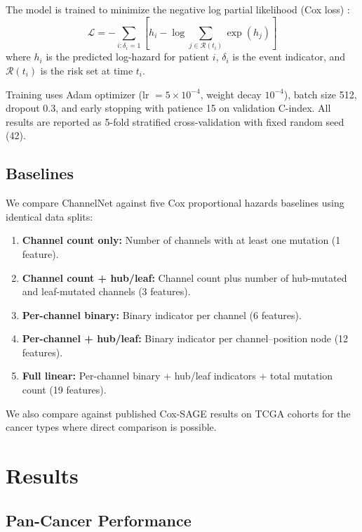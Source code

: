 \documentclass[11pt]{article}
\begin{document}
The model is trained to minimize the negative log partial
likelihood (Cox loss) \cite{Cox1972}:
\[
\mathcal{L} = -\sum_{i: \delta_i = 1}
\left[ h_i - \log \sum_{j \in \mathcal{R}(t_i)} \exp(h_j)
\right]
\]
where $h_i$ is the predicted log-hazard for patient $i$,
$\delta_i$ is the event indicator, and $\mathcal{R}(t_i)$ is
the risk set at time $t_i$.

Training uses Adam optimizer (lr $= 5 \times 10^{-4}$, weight
decay $10^{-4}$), batch size 512, dropout 0.3, and early
stopping with patience 15 on validation C-index. All results
are reported as 5-fold stratified cross-validation with fixed
random seed (42).

\subsection{Baselines}

We compare ChannelNet against five Cox proportional hazards
baselines using identical data splits:

\begin{enumerate}
\item \textbf{Channel count only:} Number of channels with at
   least one mutation (1 feature).
\item \textbf{Channel count + hub/leaf:} Channel count plus
   number of hub-mutated and leaf-mutated channels (3 features).
\item \textbf{Per-channel binary:} Binary indicator per channel
   (6 features).
\item \textbf{Per-channel + hub/leaf:} Binary indicator per
   channel--position node (12 features).
\item \textbf{Full linear:} Per-channel binary + hub/leaf
   indicators + total mutation count (19 features).
\end{enumerate}

We also compare against published Cox-SAGE results
\cite{Bao2024} on TCGA cohorts for the cancer types where
direct comparison is possible.

\section{Results}
\label{sec:results}

\subsection{Pan-Cancer Performance}
\end{document}

